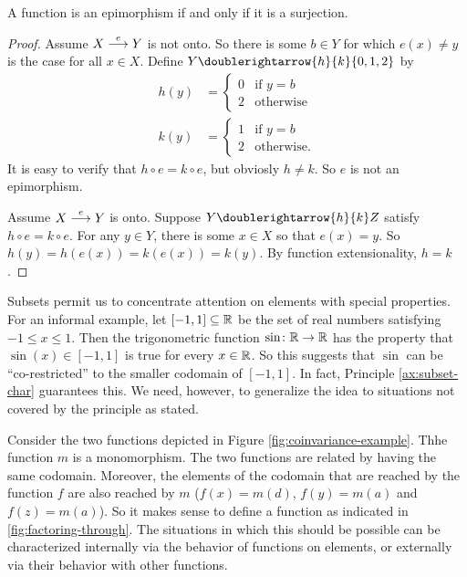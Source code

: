\begin{lemma}
	A function is an epimorphism if and only if it is a surjection.
	
	\begin{proof}
		Assume $\sfromto eXY$ is not onto. So there is some $b\in Y$ for which $e(x)\neq y$ is the case for all $x\in X$. Define $Y\doublerightarrow{h}{k}\{0,1,2\}$ by
		\begin{align*}h(y) &= \begin{cases}
			0 &\text{if $y=b$}\\
			2 &\text{otherwise}
			\end{cases}\\
			k(y) &= \begin{cases}
			1 & \text{if $y=b$}\\
			2 &\text{otherwise.}
			\end{cases}
		\end{align*}
		It is easy to verify that $h\circ e = k\circ e$, but obviosly $h\neq k$. So $e$ is not an epimorphism.
		
		Assume $\sfromto eXY$ is onto. Suppose $Y\doublerightarrow{h}{k}Z$ 
		satisfy $h\circ e=k\circ e$. For any $y\in Y$, there is some $x\in X$ so that $e(x)=y$. So $h(y)=h(e(x))=k(e(x))=k(y)$. By function extensionality, $h=k$.
	\end{proof}
\end{lemma}

Subsets permit us to concentrate attention on elements with special properties.
For an informal example, let $[-1,1]\subseteq\RR$ be the set of real numbers satisfying $-1\leq x\leq 1$.
Then the trigonometric function $\fromto \sin\RR\RR$ has the property that $\sin(x)\in [-1,1]$ is true for every $x\in\RR$.
So this suggests that $\sin$ can be ``co-restricted'' to the smaller codomain of $[-1,1]$. In fact, Principle \ref{ax:subset-char} guarantees this.
We need, however, to generalize the idea to situations not covered by the principle as stated.

Consider the two functions depicted in Figure \ref{fig:coinvariance-example}. Thhe function $m$ is a monomorphism. The two functions are related by having the same codomain. Moreover, the elements of the codomain that are reached by the function $f$ are also reached by $m$ ($f(x)=m(d)$, $f(y)=m(a)$ and $f(z)=m(a)$). So it makes sense to define a function as indicated in \ref{fig:factoring-through}. The situations in which this should be possible can be characterized internally via the behavior of functions on elements, or externally via their behavior with other functions. 

